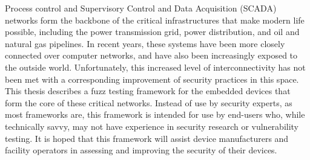 Process control and Supervisory Control and Data Acquisition (SCADA) networks form the backbone of the critical infrastructures that
make modern life possible, including the power transmission grid, power distribution, and
oil and natural gas pipelines. In recent years, these systems have been more closely
connected over computer networks, and have also been increasingly exposed to the outside
world. Unfortunately, this increased level of interconnectivity has not been met with
a corresponding improvement of security practices in this space. This thesis describes
a fuzz testing framework for the embedded devices that form the core of these critical networks.
Instead of use by security experts, as most frameworks are, this framework is intended for use
by end-users who, while technically savvy, may not have experience in security research or
vulnerability testing. It is hoped that this framework will assist device manufacturers and
facility operators in assessing and improving the security of their devices.

